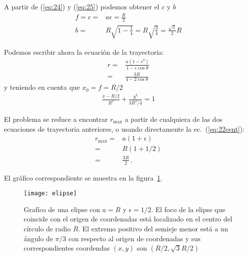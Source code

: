 \begin{itemize}
A partir de (\ref{eq:24}) y (\ref{eq:25}) podemos obtener el $c$ y $b$ 
\begin{align}
  \label{eq:23}
  f=c=&a\epsilon=\frac{R}{2}\nonumber\\
  b=&R\sqrt{1-\frac{1}{4}}=R\sqrt{\frac{3}{4}}=\frac{\sqrt{3}}{2}R
\end{align}

Podemos escribir ahora la ecuación de la trayectoria:
\begin{align}
  \label{eq:tray1}
  r=&\frac{a(1-\epsilon^2)}{1-\epsilon\cos\theta}\nonumber\\
  =&\frac{3R}{4-2\cos\theta}
\end{align}
y teniendo en cuenta que $x_0=f=R/2$
\begin{align}
  \label{eq:tray2}
  \frac{x-R/2}{R^2}+\frac{y^2}{3R^2/4}=1
\end{align}


El problema se reduce a encontrar $r_{\text{max}}$ a partir de cualquiera de las dos ecuaciones de trayectoria anteriores, o usando directamente la ec.~(\ref{eq:22cent}):
\begin{align}
  r_{\text{max}}=&a(1+\epsilon)\nonumber\\
  =&R(1+1/2)\nonumber\\
  =&\frac{3R}{2}\,.
\end{align}



El gráfico correspondiente se muestra en la figura~\ref{fig:elipse}.
\begin{frame}  
\begin{figure}
  \centering
  \texttt{[image: elipse]}
  \caption{Grafíco de una elipse con $a=R$ y $\epsilon=1/2$. El foco de la elipse que coincide con el origen de coordenadas está localizado en el centro del círculo de radio $R$. El extremo positivo del semieje menor está a un ángulo de $\pi/3$ con respecto al origen de coordenadas y sus correspondientes coordendas $(x,y)$ son  $(R/2,\sqrt{3}R/2)$} 
  \label{fig:elipse}
\end{figure}
\end{frame}


\end{itemize}
